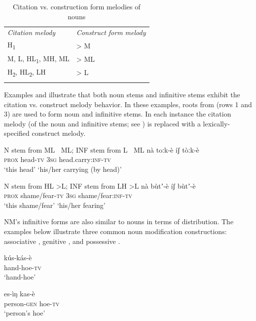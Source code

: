 \documentclass[output=paper]{langsci/langscibook}
\begin{document}
\begin{table}
\caption{Citation vs. construction form melodies of nouns}
\label{tab:mahland:4}

\begin{tabularx}{\textwidth}{XX}
\lsptoprule

\itshape Citation melody & \itshape Construct form melody\\
H\textsubscript{1} & {\textgreater} M\\
M, L, HL\textsubscript{1}, MH, ML & {\textgreater} ML\\
H\textsubscript{2}, HL\textsubscript{2}, LH & {\textgreater} L\\
\lspbottomrule
\end{tabularx}
\end{table}

Examples  and  illustrate that both noun stems and infinitive stems exhibit the citation vs. construct melody behavior. In these examples, roots from  (rows 1 and 3) are used to form noun and infinitive stems. In each instance the citation melody (of the noun and infinitive stems; see ) is replaced with a lexically-specified construct melody.  


\ea\label{ex:mahland:24}
N stem from ML $\>$ ML; INF stem from L $\>$ ML
\gll nà      toːk-è    íʃ      tòːk-è\\
\textsc{prox}   head\textsc{{}-tv}  \textsc{3sg}    head.carry\textsc{:inf-tv}\\
\glt `this head'    `his/her carrying (by head)'
\z

\ea\label{ex:mahland:25}
N stem from HL \textgreater L; INF stem from LH \textgreater L
\gll nà       bùtʼ-è      íʃ        bùtʼ-è\\
\textsc{prox}   shame/fear\textsc{{}-tv}   \textsc{3sg}     shame/fear:\textsc{inf-tv} \\
\glt `this shame/fear'    `his/her fearing'
\z

NM's infinitive forms are also similar to nouns in terms of distribution. The examples below illustrate three common noun modification constructions: associative , genitive , and possessive .

\ea\label{ex:mahland:26}
\gll kús-kás-è  \\
hand-hoe\textsc{{}-tv}\\
\glt `hand-hoe'
\z

\ea\label{ex:mahland:27}
\gll es-ìŋ            kas-è   \\
person\textsc{{}-gen}   hoe\textsc{{}-tv}\\
\glt `person's hoe'
\z
\end{document}
